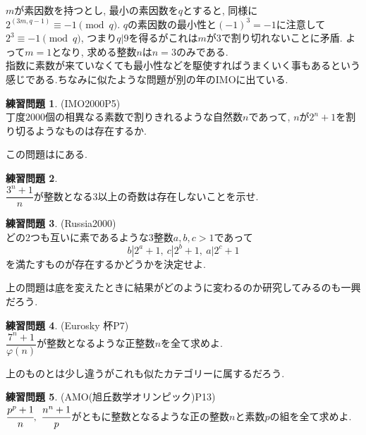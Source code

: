 \documentclass{ltjsarticle}
\theoremstyle{definition}
\newtheorem{prob}{練習問題}
\begin{document}
$m$が素因数を持つとし, 最小の素因数を$q$とすると, 同様に$2^{(3m,q-1)}\equiv -1\pmod q$. $q$の素因数の最小性と$(-1)^3=-1$に注意して$2^3\equiv -1\pmod q$, つまり$q|9$を得るがこれは$m$が$3$で割り切れないことに矛盾. よって$m=1$となり, 求める整数$n$は$n=3$のみである.\\

指数に素数が来ていなくても最小性などを駆使すればうまくいく事もあるという感じである.ちなみに似たような問題が別の年のIMOに出ている.\\

\begin{prob}(IMO2000P5)\\
丁度$2000$個の相異なる素数で割りきれるような自然数$n$であって, $n$が$2^n+1$を割り切るようなものは存在するか.
\end{prob}

この問題は\cite{精選}にある.
\begin{prob}\ \\
$\dfrac{3^n+1}{n}$が整数となる$3$以上の奇数は存在しないことを示せ.
\end{prob}

\begin{prob}(Russia2000)\\
どの$2$つも互いに素であるような$3$整数$a,b,c>1$であって$$b|2^a+1,\ c|2^b+1,\ a|2^c+1$$を満たすものが存在するかどうかを決定せよ.
\end{prob}

上の問題は底を変えたときに結果がどのように変わるのか研究してみるのも一興だろう.

\begin{prob}(Eurosky 杯P7)\\
$\dfrac{7^n+1}{\varphi(n)}$が整数となるような正整数$n$を全て求めよ.
\end{prob}

上のものとは少し違うがこれも似たカテゴリーに属するだろう.

\begin{prob}(AMO(旭丘数学オリンピック)P13)\\
$\cfrac{p^p+1}n,\ \cfrac{n^n+1}p$がともに整数となるような正の整数$n$と素数$p$の組を全て求めよ.
\end{prob}
\end{document}

